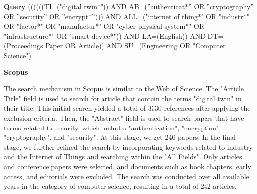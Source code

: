\begin{tcolorbox}[colback=black!5!white, sharp corners=all, colframe=white!95!black]
\textbf{Query}
\tcblower
((((((TI=("digital twin*")) AND AB=(”authenticat*” OR ”cryptography” OR ”security” OR ”encrypt*”))) AND ALL=("internet of thing*" OR "industr*"  OR  "factor*"  OR  "manufactur*"  OR  "cyber physical system*"  OR  "infrastructure*" OR "smart device*")) AND LA=(English)) AND DT=(Proceedings Paper OR Article)) AND SU=(Engineering OR "Computer Science")  \\



\end{tcolorbox}



\textbf{Scopus}

The search mechanism in Scopus is similar to the Web of Science. The "Article Title" field is used to search for article that contain the terms "digital twin" in their title. This initial search yielded a total of 3330 references after applying the exclusion criteria. Then, the "Abstract" field is used to search  papers that have terms related to security, which includes  "authentication", "encryption", "cryptography", and "security". At this stage, we get 240 papers. In the final stage,  we further refined the search by incorporating keywords related to industry and the Internet of Things and searching within the "All Fields". Only articles and conference papers were selected, and documents such as book chapters, early access, and editorials were excluded. The search was conducted over all available years in the category of computer science, resulting in a total of 242 articles.

